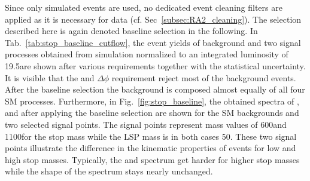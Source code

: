 Since only simulated events are used, no dedicated event cleaning filters are applied as it is necessary for data (cf. Sec~\ref{subsec:RA2_cleaning}). The selection described here is again denoted baseline selection in the following. In Tab.~\ref{tab:stop_baseline_cutflow}, the event yields of background and two signal processes obtained from simulation normalized to an integrated luminosity of 19.5\fbinv are shown after various requirements together with the statistical uncertainty. It is visible that the \met and $\Delta \phi$ requirement reject most of the background events. After the baseline selection the background is composed almost equally of all four SM processes. Furthermore, in Fig.~\ref{fig:stop_baseline}, the obtained spectra of \HT, \met and \NJets after applying the baseline selection are shown for the SM backgrounds and two selected signal points. The signal points represent mass values of 600\gev and 1100\gev for the stop mass while the LSP mass is in both cases 50\gev. These two signal points illustrate the difference in the kinematic properties of events for low and high stop masses. Typically, the \HT and \met spectrum get harder for higher stop masses while the shape of the \NJets spectrum stays nearly unchanged. 
\begin{table}[!t]
\fontsize{9 pt}{1.2 em}
\selectfont
\centering
\caption{Event yields and cut flow from MC simulated samples after various requirements described in the text. All numbers are scaled to 19.5\fbinv. Only statistical uncertainties are shown in the table. The signal points are labelled as (X, Y) where X is the top squark mass and Y is the LSP mass in GeV.}
\label{tab:stop_baseline_cutflow}
\end{table}    
